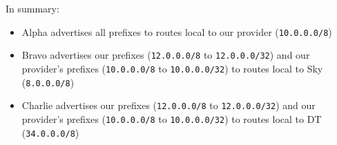 In summary:

\begin{itemize}
    \item Alpha advertises all prefixes to routes local to our provider
    (\texttt{10.0.0.0/8})

    \item Bravo advertises our prefixes (\texttt{12.0.0.0/8} to \texttt
    {12.0.0.0/32}) and our  provider's prefixes (\texttt{10.0.0.0/8} to
    \texttt{10.0.0.0/32}) to routes local to Sky (\texttt{8.0.0.0/8})

    \item Charlie advertises our prefixes (\texttt{12.0.0.0/8} to \texttt
    {12.0.0.0/32}) and our provider's prefixes (\texttt{10.0.0.0/8} to \texttt
    {10.0.0.0/32}) to routes local to DT (\texttt{34.0.0.0/8})
\end{itemize}